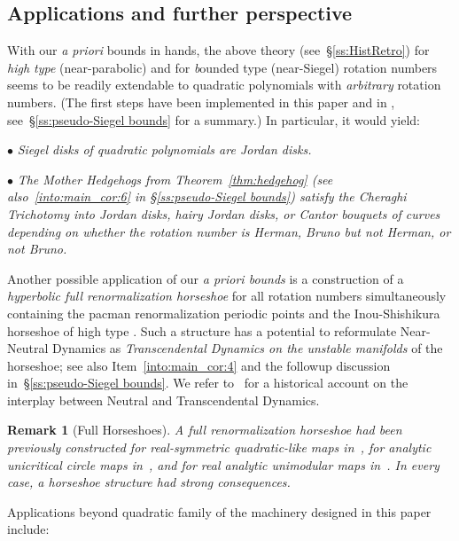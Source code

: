 \documentclass{amsart}
\newcommand{\1}{{\mathbb 1 }}
\newtheorem{rem}[thm]{Remark}
\theoremstyle{remark}
\numberwithin{equation}{section}
\theoremstyle{definition}
\begin{document}
\subsection{Applications and further perspective}
\label{ss:models} With our {\em a priori} bounds in hands,
the above theory (see~\S\ref{ss:HistRetro}) for {\em  high type} (near-parabolic) and for {\emph bounded type} (near-Siegel) rotation numbers seems to be readily  extendable to quadratic polynomials with  {\em arbitrary}
rotation numbers. (The first steps have been implemented in this paper and in \cite{DL:sector bounds}, see~\S\ref{ss:pseudo-Siegel bounds} for a summary.) In particular, it would yield:


\noindent $\bullet$
{\em Siegel disks of quadratic polynomials are Jordan disks.} 

\noindent $\bullet$
{\em The Mother Hedgehogs from Theorem~\ref{thm:hedgehog} (see also~\ref{into:main_cor:6} in \S\ref{ss:pseudo-Siegel bounds}) satisfy the Cheraghi Trichotomy into Jordan disks, hairy
  Jordan disks, or  Cantor bouquets of curves depending on whether
the rotation number is Herman, Bruno but not Herman, or not Bruno.} 



Another possible application of our {\em a priori bounds}
is a construction of a  {\em hyperbolic full renormalization horseshoe} for all
rotation numbers simultaneously containing the pacman renormalization periodic points \cite{McM3,Ya-posmeas,DLS} and the Inou-Shishikura horseshoe of high type \cite{IS}. Such a structure has a potential to reformulate Near-Neutral Dynamics as \emph{Transcendental Dynamics on the unstable manifolds} of the horseshoe; see also Item~\ref{into:main_cor:4} and the followup discussion in~\S\ref{ss:pseudo-Siegel bounds}. We refer to~\cite[\S 1.4]{DL} for a historical account on the interplay between Neutral and Transcendental Dynamics.
 



\begin{rem}[Full  Horseshoes] \label{rem:fill hors}A full renormalization horseshoe had been previously constructed for real-symmetric quadratic-like maps in~\cite{L-regul vs stoch}, for analytic unicritical circle maps in~\cite{Ya:hors}, and for real analytic unimodular maps in~\cite{ALM}. In every case, a horseshoe structure had strong consequences.
\end{rem}


Applications beyond quadratic family of the machinery designed in this paper
include:
\end{document}
